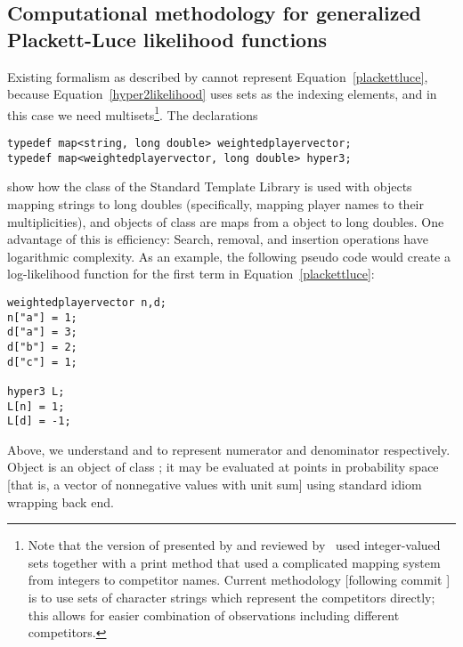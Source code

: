 \documentclass[article]{jss}
\begin{document}
\subsection{Computational methodology for generalized Plackett-Luce likelihood functions}

Existing  formalism as described by \citet{hankin2017}
cannot represent Equation~\ref{plackettluce}, because
Equation~\ref{hyper2likelihood} uses sets as the indexing elements,
and in this case we need multisets\footnote{Note that the version of
 presented by \citet{hankin2017} and reviewed
by~\cite{turner2020} used integer-valued sets together with a print
method that used a complicated mapping system from integers to
competitor names.  Current methodology [following commit
  ] is to use sets of character strings which represent
the competitors directly; this allows for easier combination of
observations including different competitors.}.  The declarations

\begin{verbatim}
typedef map<string, long double> weightedplayervector;
typedef map<weightedplayervector, long double> hyper3;
\end{verbatim}

show how the  class of the Standard Template Library is
used with  objects mapping strings to
long doubles (specifically, mapping player names to their
multiplicities), and objects of class  are maps from
a  object to long doubles.  One
advantage of this is efficiency: Search, removal, and insertion
operations have logarithmic complexity.  As an example, the following
 pseudo code would create a log-likelihood function for
the first term in Equation~\ref{plackettluce}:

\begin{verbatim}
weightedplayervector n,d;
n["a"] = 1; 
d["a"] = 3; 
d["b"] = 2;
d["c"] = 1;

hyper3 L;
L[n] = 1;
L[d] = -1;
\end{verbatim}

Above, we understand  and  to represent numerator and
denominator respectively.  Object  is an object of class
; it may be evaluated at points in probability space
[that is, a vector \code{[a,b,c]} of nonnegative values with unit sum]
using standard  idiom wrapping  back end.
\end{document}
